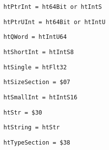 \begin{verbatim}
htPtrInt = ht64Bit or htIntS
\end{verbatim}
\label{thoriumcore:thorium:htptrint}



\begin{verbatim}
htPtrUInt = ht64Bit or htIntU
\end{verbatim}
\label{thoriumcore:thorium:htptruint}



\begin{verbatim}
htQWord = htIntU64
\end{verbatim}
\label{thoriumcore:thorium:htqword}



\begin{verbatim}
htShortInt = htIntS8
\end{verbatim}
\label{thoriumcore:thorium:htshortint}



\begin{verbatim}
htSingle = htFlt32
\end{verbatim}
\label{thoriumcore:thorium:htsingle}



\begin{verbatim}
htSizeSection = $07
\end{verbatim}
\label{thoriumcore:thorium:htsizesection}



\begin{verbatim}
htSmallInt = htIntS16
\end{verbatim}
\label{thoriumcore:thorium:htsmallint}



\begin{verbatim}
htStr = $30
\end{verbatim}
\label{thoriumcore:thorium:htstr}



\begin{verbatim}
htString = htStr
\end{verbatim}
\label{thoriumcore:thorium:htstring}



\begin{verbatim}
htTypeSection = $38
\end{verbatim}
\label{thoriumcore:thorium:httypesection}



